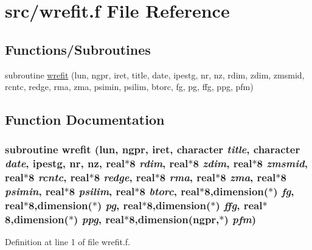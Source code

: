 \hypertarget{wrefit_8f}{
\section{src/wrefit.f File Reference}
\label{wrefit_8f}
}
\subsection*{Functions/Subroutines}
\begin{CompactItemize}
\item 
subroutine \hyperlink{wrefit_8f_8862f0fdb344936b7a4e22b4f727a795}{wrefit} (lun, ngpr, iret, title, date, ipestg, nr, nz, rdim, zdim, zmsmid, rcntc, redge, rma, zma, psimin, psilim, btorc, fg, pg, ffg, ppg, pfm)
\end{CompactItemize}


\subsection{Function Documentation}
\hypertarget{wrefit_8f_8862f0fdb344936b7a4e22b4f727a795}{
\subsubsection[wrefit]{\setlength{\rightskip}{0pt plus 5cm}subroutine wrefit (lun, \/  ngpr, \/  iret, \/  character {\em title}, \/  character {\em date}, \/  ipestg, \/  nr, \/  nz, \/  real$\ast$8 {\em rdim}, \/  real$\ast$8 {\em zdim}, \/  real$\ast$8 {\em zmsmid}, \/  real$\ast$8 {\em rcntc}, \/  real$\ast$8 {\em redge}, \/  real$\ast$8 {\em rma}, \/  real$\ast$8 {\em zma}, \/  real$\ast$8 {\em psimin}, \/  real$\ast$8 {\em psilim}, \/  real$\ast$8 {\em btorc}, \/  real$\ast$8,dimension($\ast$) {\em fg}, \/  real$\ast$8,dimension($\ast$) {\em pg}, \/  real$\ast$8,dimension($\ast$) {\em ffg}, \/  real$\ast$8,dimension($\ast$) {\em ppg}, \/  real$\ast$8,dimension(ngpr,$\ast$) {\em pfm})}}
\label{wrefit_8f_8862f0fdb344936b7a4e22b4f727a795}




Definition at line 1 of file wrefit.f.